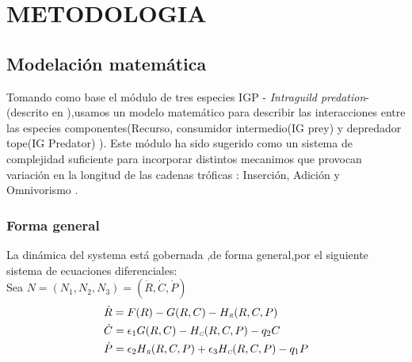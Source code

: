 \section{METODOLOGIA}

\subsection{Modelaci\'on matem\'atica}



Tomando como base el m\'odulo de tres especies  IGP - \emph{Intraguild predation}-(descrito en \citealt{polis1989ecology,polis1992intraguild}),usamos un modelo matem\'atico\citep{holt1997theoretical} para describir las interacciones entre las especies componentes(Recurso, consumidor intermedio(IG prey) y depredador tope(IG Predator) ). Este m\'odulo ha sido sugerido como un sistema de complejidad suficiente para incorporar distintos mecanimos que provocan variaci\'on en la longitud de las cadenas tr\'oficas : Inserci\'on, Adici\'on y Omnivorismo \citep{TP2007proximate}.
\subsubsection{Forma general}
La din\'amica del systema est\'a gobernada ,de forma general,por el siguiente sistema de ecuaciones diferenciales: \\
Sea $ N= (N_1,N_2,N_3) = (\dot{R} , \dot{C} , \dot{P})  $
\begin{equation}\label{eq:Gsystem}
\begin{aligned}
&\dot{R} = F(R) -G(R,C)-H_{\textit{\tiny R}}(R,C,P)  \\
&\dot{C} = \epsilon_1 G(R,C)-H_{\textit{\tiny C}}(R,C,P) - q_2 C  \\
&\dot{P} = \epsilon_2 H_{\textit{\tiny R}}(R,C,P) +\epsilon_3 H_{\textit{\tiny C}}(R,C,P) -q_1 P
\end{aligned}
\end{equation}
